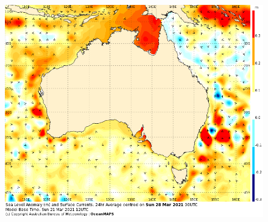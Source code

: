 \begin{frame}
\begin{minipage}{0.45\textwidth}
\begin{figure}
     \includegraphics[width=\textwidth]{figures/images/IDYOC300.Aus.SLACur.168.png}
    \end{figure} 
\end{minipage}
\end{frame}
